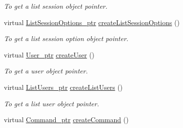 \begin{DoxyCompactItemize}
\begin{DoxyCompactList}\small\item\em To get a list session object pointer. \item\end{DoxyCompactList}\item 
\hypertarget{classUMS__Data_1_1UMS__DataFactory_ab74c4016b1e1a08655ad7b56bdafa7ae}{
virtual \hyperlink{classUMS__Data_1_1ListSessionOptions}{ListSessionOptions\_\-ptr} \hyperlink{classUMS__Data_1_1UMS__DataFactory_ab74c4016b1e1a08655ad7b56bdafa7ae}{createListSessionOptions} ()}
\label{classUMS__Data_1_1UMS__DataFactory_ab74c4016b1e1a08655ad7b56bdafa7ae}

\begin{DoxyCompactList}\small\item\em To get a list session option object pointer. \item\end{DoxyCompactList}\item 
\hypertarget{classUMS__Data_1_1UMS__DataFactory_a601a600d7324c6c0172a536361857481}{
virtual \hyperlink{classUMS__Data_1_1User}{User\_\-ptr} \hyperlink{classUMS__Data_1_1UMS__DataFactory_a601a600d7324c6c0172a536361857481}{createUser} ()}
\label{classUMS__Data_1_1UMS__DataFactory_a601a600d7324c6c0172a536361857481}

\begin{DoxyCompactList}\small\item\em To get a user object pointer. \item\end{DoxyCompactList}\item 
\hypertarget{classUMS__Data_1_1UMS__DataFactory_afb0d985e2f822fe3c2e448430aa66171}{
virtual \hyperlink{classUMS__Data_1_1ListUsers}{ListUsers\_\-ptr} \hyperlink{classUMS__Data_1_1UMS__DataFactory_afb0d985e2f822fe3c2e448430aa66171}{createListUsers} ()}
\label{classUMS__Data_1_1UMS__DataFactory_afb0d985e2f822fe3c2e448430aa66171}

\begin{DoxyCompactList}\small\item\em To get a list user object pointer. \item\end{DoxyCompactList}\item 
\hypertarget{classUMS__Data_1_1UMS__DataFactory_afdea00511ea652d663d8fb5052a5f07c}{
virtual \hyperlink{classUMS__Data_1_1Command}{Command\_\-ptr} \hyperlink{classUMS__Data_1_1UMS__DataFactory_afdea00511ea652d663d8fb5052a5f07c}{createCommand} ()}
\label{classUMS__Data_1_1UMS__DataFactory_afdea00511ea652d663d8fb5052a5f07c}


\end{DoxyCompactItemize}
